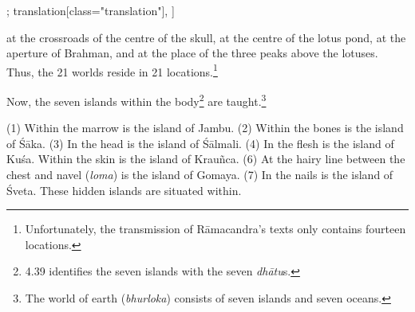 \begin{alignment}[
  texts=edition[class="edition"];
  translation[class="translation"],
  ]
\begin{translation}
\begin{tlate}[p35_02]
[two] at the crossroads of the centre of the skull, at the centre of the lotus pond, at the aperture of Brahman, and at the place of the three peaks above the lotuses. \textbf{\Large{\sic*{}}} Thus, the 21 worlds reside in 21 locations.\footnote{Unfortunately, the transmission of Rāmacandra's texts only contains fourteen locations.}
\end{tlate}
  \begin{tlate}[p36_01]
\noindent
Now, the seven islands within the body\footnote{ 4.39 identifies the seven islands with the seven \textit{dhātu}s.} are taught.\footnote{The world of earth (\textit{bhurloka}) consists of seven islands and seven oceans.} 

(1) Within the marrow is the island of Jambu. (2) Within the bones is the island of Śāka. (3) In the head is the island of Śālmali. (4) In the flesh is the island of Kuśa. Within the skin is the island of Krauñca. (6) At the hairy line between the chest and navel (\textit{loma}) is the island of Gomaya. (7) In the nails is the island of Śveta. These hidden islands are situated within.
\flushpage
\end{tlate}
  \end{translation}
\end{alignment}
\pagebreak %
